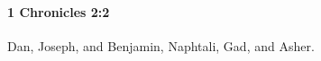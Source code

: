 
		\paragraph{1 Chronicles 2:2} %
			\label{1CHRONICLES-2-2}

			Dan, Joseph, and Benjamin, Naphtali, Gad, and Asher.


